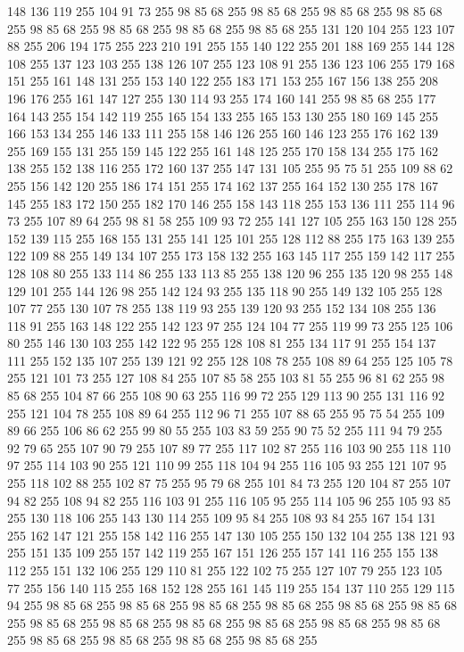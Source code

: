 148 136 119 255 104 91 73 255 98 85 68 255 98 85 68 255 98 85 68 255 98 85 68 255 98 85 68 255 98 85 68 255 98 85 68 255 98 85 68 255 131 120 104 255 123 107 88 255 206 194 175 255 223 210 191 255 155 140 122 255 201 188 169 255 144 128 108 255 137 123 103 255 138 126 107 255 123 108 91 255 136 123 106 255 179 168 151 255 161 148 131 255 153 140 122 255 183 171 153 255 167 156 138 255 208 196 176 255 161 147 127 255 130 114 93 255 174 160 141 255 98 85 68 255 177 164 143 255 154 142 119 255 165 154 133 255 165 153 130 255 180 169 145 255 166 153 134 255 146 133 111 255 158 146 126 255 160 146 123 255 176 162 139 255 169 155 131 255 159 145 122 255 161 148 125 255 170 158 134 255 175 162 138 255 152 138 116 255 172 160 137 255 147 131 105 255 95 75 51 255 109 88 62 255 156 142 120 255 186 174 151 255 174 162 137 255 164 152 130 255 178 167 145 255 183 172 150 255 182 170 146 255 158 143 118 255 153 136 111 255 114 96 73 255 107 89 64 255 98 81 58 255 109 93 72 255
141 127 105 255 163 150 128 255 152 139 115 255 168 155 131 255 141 125 101 255 128 112 88 255 175 163 139 255 122 109 88 255 149 134 107 255 173 158 132 255 163 145 117 255 159 142 117 255 128 108 80 255 133 114 86 255 133 113 85 255 138 120 96 255 135 120 98 255 148 129 101 255 144 126 98 255 142 124 93 255 135 118 90 255 149 132 105 255 128 107 77 255 130 107 78 255 138 119 93 255 139 120 93 255 152 134 108 255 136 118 91 255 163 148 122 255 142 123 97 255 124 104 77 255 119 99 73 255 125 106 80 255 146 130 103 255 142 122 95 255 128 108 81 255 134 117 91 255 154 137 111 255 152 135 107 255 139 121 92 255 128 108 78 255 108 89 64 255 125 105 78 255 121 101 73 255 127 108 84 255 107 85 58 255 103 81 55 255 96 81 62 255 98 85 68 255 104 87 66 255 108 90 63 255 116 99 72 255 129 113 90 255 131 116 92 255 121 104 78 255 108 89 64 255 112 96 71 255 107 88 65 255 95 75 54 255 109 89 66 255 106 86 62 255 99 80 55 255 103 83 59 255 90 75 52 255
111 94 79 255 92 79 65 255 107 90 79 255 107 89 77 255 117 102 87 255 116 103 90 255 118 110 97 255 114 103 90 255 121 110 99 255 118 104 94 255 116 105 93 255 121 107 95 255 118 102 88 255 102 87 75 255 95 79 68 255 101 84 73 255 120 104 87 255 107 94 82 255 108 94 82 255 116 103 91 255 116 105 95 255 114 105 96 255 105 93 85 255 130 118 106 255 143 130 114 255 109 95 84 255 108 93 84 255 167 154 131 255 162 147 121 255 158 142 116 255 147 130 105 255 150 132 104 255 138 121 93 255 151 135 109 255 157 142 119 255 167 151 126 255 157 141 116 255 155 138 112 255 151 132 106 255 129 110 81 255 122 102 75 255 127 107 79 255 123 105 77 255 156 140 115 255 168 152 128 255 161 145 119 255 154 137 110 255 129 115 94 255 98 85 68 255 98 85 68 255 98 85 68 255 98 85 68 255 98 85 68 255 98 85 68 255 98 85 68 255 98 85 68 255 98 85 68 255 98 85 68 255 98 85 68 255 98 85 68 255 98 85 68 255 98 85 68 255 98 85 68 255 98 85 68 255
